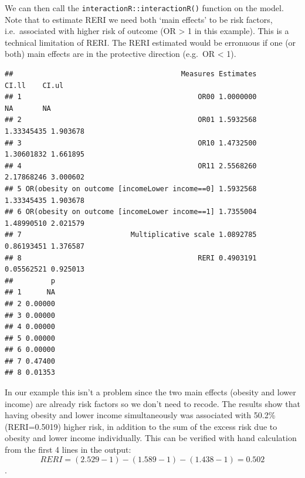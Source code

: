\documentclass[
]{book}
\newenvironment{Shaded}{\begin{snugshade}}{\end{snugshade}}
\newcommand{\AttributeTok}[1]{\textcolor[rgb]{0.13,0.29,0.53}{#1}}
\newcommand{\FunctionTok}[1]{\textcolor[rgb]{0.13,0.29,0.53}{\textbf{#1}}}
\newcommand{\NormalTok}[1]{#1}
\newcommand{\OtherTok}[1]{\textcolor[rgb]{0.56,0.35,0.01}{#1}}
\newcommand{\SpecialCharTok}[1]{\textcolor[rgb]{0.81,0.36,0.00}{\textbf{#1}}}
\newcommand{\StringTok}[1]{\textcolor[rgb]{0.31,0.60,0.02}{#1}}
\begin{document}
We can then call the \texttt{interactionR::interactionR()} function on the model. Note that to estimate RERI we need both `main effects' to be risk factors, i.e.~associated with higher risk of outcome (OR \textgreater{} 1 in this example). This is a technical limitation of RERI. The RERI estimated would be erronuous if one (or both) main effects are in the protective direction (e.g.~OR \textless{} 1).

\begin{Shaded}
\end{Shaded}

\begin{verbatim}
##                                        Measures Estimates      CI.ll    CI.ul
## 1                                          OR00 1.0000000         NA       NA
## 2                                          OR01 1.5932568 1.33345435 1.903678
## 3                                          OR10 1.4732500 1.30601832 1.661895
## 4                                          OR11 2.5568260 2.17868246 3.000602
## 5 OR(obesity on outcome [incomeLower income==0] 1.5932568 1.33345435 1.903678
## 6 OR(obesity on outcome [incomeLower income==1] 1.7355004 1.48990510 2.021579
## 7                          Multiplicative scale 1.0892785 0.86193451 1.376587
## 8                                          RERI 0.4903191 0.05562521 0.925013
##         p
## 1      NA
## 2 0.00000
## 3 0.00000
## 4 0.00000
## 5 0.00000
## 6 0.00000
## 7 0.47400
## 8 0.01353
\end{verbatim}

In our example this isn't a problem since the two main effects (obesity and lower income) are already risk factors so we don't need to recode. The results show that having obesity and lower income simultaneously was associated with 50.2\% (RERI=0.5019) higher risk, in addition to the sum of the excess risk due to obesity and lower income individually. This can be verified with hand calculation from the first 4 lines in the output: \[RERI = (2.529 - 1) - (1.589 - 1) - (1.438 - 1) = 0.502\].
\end{document}
